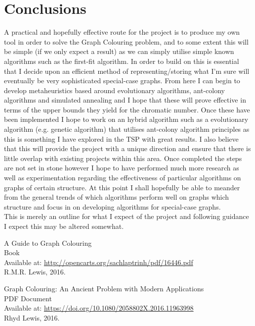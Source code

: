 \documentclass[12pt, a4paper]{article}
\begin{document}
{\section*{Conclusions}
\hspace{\parindent} A practical and hopefully effective route for the project is to produce my own tool in order to solve the Graph Colouring problem, and to some extent this will be simple (if we only expect a result) as we can simply utilise simple known algorithms such as the first-fit algorithm. In order to build on this is essential that I decide upon an efficient method of representing/storing what I'm sure will eventually be very sophisticated special-case graphs. From here I can begin to develop metaheuristics based around evolutionary algorithms, ant-colony algorithms and simulated annealing and I hope that these will prove effective in terms of the upper bounds they yield for the chromatic number. Once these have been implemented I hope to work on an hybrid algorithm such as a evolutionary algorithm (e.g. genetic algorithm) that utilises ant-colony algorithm principles as this is something I have explored in the TSP with great results. I also believe that this will provide the project with a unique direction and ensure that there is little overlap with existing projects within this area. Once completed the steps are not set in stone however I hope to have performed much more research as well as experimentation regarding the effectiveness of particular algorithms on graphs of certain structure. At this point I shall hopefully be able to meander from the general trends of which algorithms perform well on graphs which structure and focus in on developing algorithms for special-case graphs.\\
This is merely an outline for what I expect of the project and following guidance I expect this may be altered somewhat.

\begin{thebibliography}{12}
 A Guide to Graph Colouring\\
Book\\
Available at: \url{http://opencarts.org/sachlaptrinh/pdf/16446.pdf}\\
R.M.R. Lewis, 2016.

 Graph Colouring: An Ancient Problem with Modern
Applications\\
PDF Document\\
Available at: \url{https://doi.org/10.1080/2058802X.2016.11963998}\\
Rhyd Lewis, 2016.


\end{thebibliography}}
\end{document}

